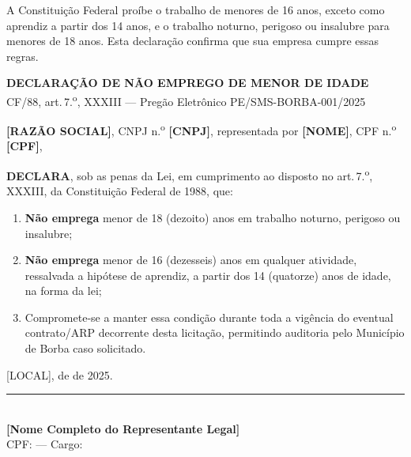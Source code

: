 \documentclass[12pt,a4paper]{article}
\newcommand{\art}[1]{art.\,#1}
\newcommand{\blank}[1]{\underline{\hspace{#1}}}
\newcommand{\editalRef}{PE/SMS-BORBA-001/2025}
\newcommand{\exercicio}{2025}
\begin{document}
\begin{dicabox}
\small
A Constituição Federal proíbe o trabalho de menores de 16 anos, exceto como
aprendiz a partir dos 14 anos, e o trabalho noturno, perigoso ou insalubre para
menores de 18 anos. Esta declaração confirma que sua empresa cumpre essas regras.
\end{dicabox}

\vspace{0.3cm}
\begin{fillbox}
\begin{center}
  {\bfseries\color{navy}DECLARAÇÃO DE NÃO EMPREGO DE MENOR DE IDADE}\\[4pt]
  {\small CF/88, \art{7.\textsuperscript{o}}, XXXIII ---
    Pregão Eletrônico \editalRef}
\end{center}
\end{fillbox}

\bigskip
\noindent\textbf{[RAZÃO SOCIAL]}, CNPJ n.\textsuperscript{o} \textbf{[CNPJ]},
representada por \textbf{[NOME]}, CPF n.\textsuperscript{o} \textbf{[CPF]},

\bigskip
\noindent\textbf{DECLARA}, sob as penas da Lei, em cumprimento ao disposto no
\art{7.\textsuperscript{o}}, XXXIII, da Constituição Federal de 1988, que:

\begin{enumerate}
  \item \textbf{Não emprega} menor de 18 (dezoito) anos em trabalho noturno,
    perigoso ou insalubre;

  \item \textbf{Não emprega} menor de 16 (dezesseis) anos em qualquer
    atividade, ressalvada a hipótese de aprendiz, a partir dos 14
    (quatorze) anos de idade, na forma da lei;

  \item Compromete-se a manter essa condição durante toda a vigência do
    eventual contrato/ARP decorrente desta licitação, permitindo auditoria
    pelo Município de Borba caso solicitado.
\end{enumerate}

\vspace{1.2cm}
\begin{center}
  [LOCAL], \blank{0.8cm} de \blank{3cm} de \exercicio.\\[1.0cm]
  \rule{9cm}{0.5pt}\\[3pt]
  \textbf{[Nome Completo do Representante Legal]}\\
  \small CPF: \blank{3cm} --- Cargo: \blank{3cm}
\end{center}
\end{document}
